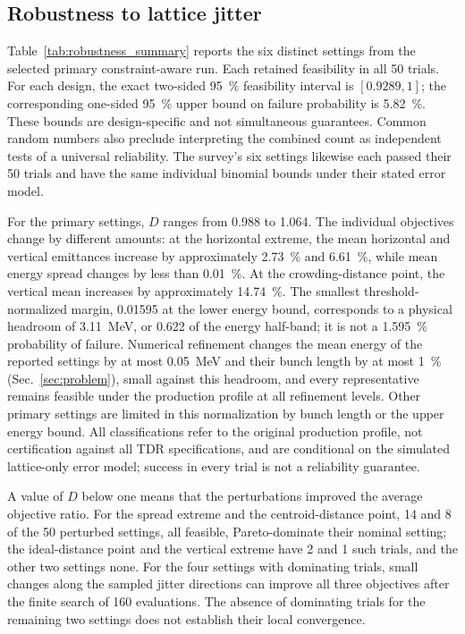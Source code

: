 \documentclass[aps,prab,reprint,superscriptaddress,amsmath,amssymb,floatfix]{revtex4-2}
\begin{document}
\subsection{Robustness to lattice jitter}
\label{sec:robustness_results}
Table~\ref{tab:robustness_summary} reports the six distinct settings from the selected
primary constraint-aware run. Each retained feasibility in all 50 trials. For each design,
the exact two-sided \SI{95}{\percent} feasibility interval is $[0.9289,1]$; the corresponding
one-sided \SI{95}{\percent} upper bound on failure probability is \SI{5.82}{\percent}.
These bounds are design-specific and not simultaneous guarantees. Common random numbers
also preclude interpreting the combined count as independent tests of a universal reliability.
The survey's six settings likewise each passed their 50 trials and have the same individual
binomial bounds under their stated error model.

For the primary settings, $D$ ranges from 0.988 to 1.064. The individual objectives change by
different amounts: at the horizontal extreme, the mean horizontal and vertical emittances
increase by approximately \SI{2.73}{\percent} and \SI{6.61}{\percent}, while mean energy spread
changes by less than \SI{0.01}{\percent}. At the crowding-distance point, the vertical mean
increases by approximately \SI{14.74}{\percent}. The smallest threshold-normalized margin,
0.01595 at the lower energy bound, corresponds to a physical headroom of
\SI{3.11}{\mega\electronvolt}, or 0.622 of the energy half-band; it is not a
\SI{1.595}{\percent} probability of failure. Numerical refinement changes the mean energy of the
reported settings by at most \SI{0.05}{\mega\electronvolt} and their bunch length by at most
\SI{1}{\percent} (Sec.~\ref{sec:problem}), small against this headroom, and every representative
remains feasible under the production profile at all refinement levels. Other primary settings
are limited in this normalization by bunch length or the upper energy bound. All classifications
refer to the original production profile, not certification against all TDR specifications, and
are conditional on the simulated lattice-only error model; success in every trial is not a
reliability guarantee.

A value of $D$ below one means that the perturbations improved the average objective ratio. For
the spread extreme and the centroid-distance point, 14 and 8 of the 50 perturbed settings, all
feasible, Pareto-dominate their nominal setting; the ideal-distance point and the vertical
extreme have 2 and 1 such trials, and the other two settings none. For the four settings with
dominating trials, small changes along the sampled jitter directions can improve all three
objectives after the finite search of 160 evaluations. The absence of dominating trials for the
remaining two settings does not establish their local convergence.
\end{document}
